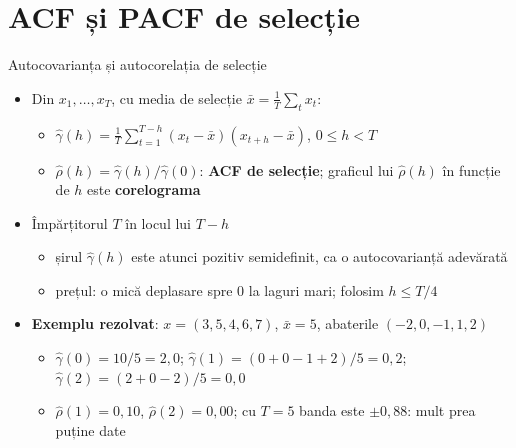 \section{ACF și PACF de selecție}

\begin{frame}{Autocovarianța și autocorelația de selecție}
\itemsize{\small}
\begin{itemize}
    \item Din $x_1, \dots, x_T$, cu media de selecție $\bar x = \frac1T\sum_t x_t$:
    \begin{itemize}
        \item $\hat\gamma(h) = \frac1T\sum_{t=1}^{T-h}(x_t - \bar x)(x_{t+h} - \bar x)$, $0 \le h < T$
        \item $\hat\rho(h) = \hat\gamma(h)/\hat\gamma(0)$: \textbf{ACF de selecție}; graficul lui $\hat\rho(h)$ în funcție de $h$ este \textbf{corelograma}
    \end{itemize}
    \item Împărțitorul $T$ în locul lui $T - h$
    \begin{itemize}
        \item șirul $\hat\gamma(h)$ este atunci pozitiv semidefinit, ca o autocovarianță adevărată 
        \item prețul: o mică deplasare spre 0 la laguri mari; folosim $h \le T/4$
    \end{itemize}
    \item \textbf{Exemplu rezolvat}: $x = (3, 5, 4, 6, 7)$, $\bar x = 5$, abaterile $(-2, 0, -1, 1, 2)$
    \begin{itemize}
        \item $\hat\gamma(0) = 10/5 = 2{,}0$; $\hat\gamma(1) = (0 + 0 - 1 + 2)/5 = 0{,}2$; $\hat\gamma(2) = (2 + 0 - 2)/5 = 0{,}0$
        \item $\hat\rho(1) = 0{,}10$, $\hat\rho(2) = 0{,}00$; cu $T = 5$ banda este $\pm 0{,}88$: mult prea puține date
    \end{itemize}
\end{itemize}
\end{frame}

